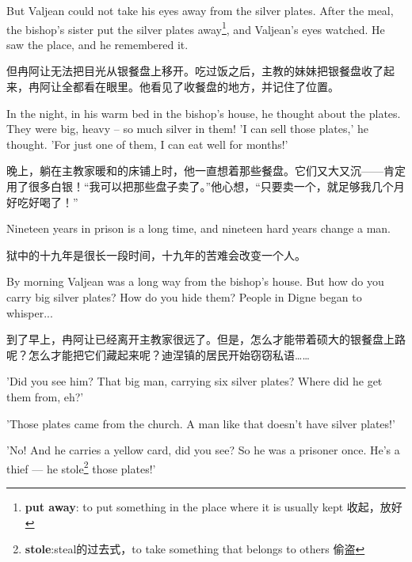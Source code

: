 \documentclass[fontset=ubuntu, zihao=5]{ctexart}
\begin{document}
\begin{paracol}{2}
  \switchcolumn*

  But Valjean could not take his eyes away from the silver plates. After the meal, the bishop's sister put the silver plates away\footnote{\textbf{put away}: to put something in the place where it is usually kept 收起，放好}, and Valjean's eyes watched. He saw the place, and he remembered it.


  \switchcolumn
  但冉阿让无法把目光从银餐盘上移开。吃过饭之后，主教的妹妹把银餐盘收了起来，冉阿让全都看在眼里。他看见了收餐盘的地方，并记住了位置。

  \switchcolumn*

  In the night, in his warm bed in the bishop's house, he thought about the
  plates. They were big, heavy – so much silver in them! 'I can sell those
  plates,' he thought. 'For just one of them, I can eat well for months!'

  \switchcolumn

  晚上，躺在主教家暖和的床铺上时，他一直想着那些餐盘。它们又大又沉——肯定用了很多白银！“我可以把那些盘子卖了。”他心想，“只要卖一个，就足够我几个月好吃好喝了！”

  \switchcolumn*

  Nineteen years in prison is a long time, and nineteen hard years change a man.

  \switchcolumn

  狱中的十九年是很长一段时间，十九年的苦难会改变一个人。

  \switchcolumn*

  \sectionbreak

  By morning Valjean was a long way from the bishop's house. But how do you carry big silver plates? How do you hide them? People in Digne began to whisper...

  \switchcolumn

  \sectionbreak
  到了早上，冉阿让已经离开主教家很远了。但是，怎么才能带着硕大的银餐盘上路呢？怎么才能把它们藏起来呢？迪涅镇的居民开始窃窃私语……


  \switchcolumn*

  'Did you see him? That big man, carrying six silver plates? Where did he get them from, eh?'

  'Those plates came from the church. A man like that doesn't have silver plates!'

  'No! And he carries a yellow card, did you see? So he was a prisoner once.
  He's a thief --- he stole\footnote{\textbf{stole}:steal的过去式，to take
    something that belongs to others 偷盗} those plates!'


\end{paracol}
\end{document}
